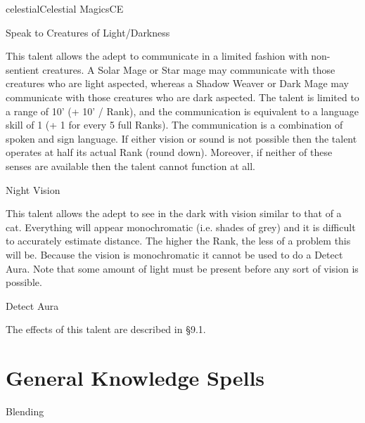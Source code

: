 \begin{College}[1.3]{celestial}{Celestial Magics}{CE}
\begin{talent}[T-1]{Speak to Creatures of Light/Darkness}
\begin{effects}
This talent allows the adept to communicate in a limited fashion with
non-sentient creatures.  A Solar Mage or Star mage may communicate
with those creatures who are light aspected, whereas a Shadow Weaver
or Dark Mage may communicate with those creatures who are dark
aspected.  The talent is limited to a range of 10’ (+ 10’ / Rank), and
the communication is equivalent to a language skill of 1 (+ 1 for
every 5 full Ranks).  The communication is a combination of spoken and
sign language.  If either vision or sound is not possible then the
talent operates at half its actual Rank (round down).  Moreover, if
neither of these senses are available then the talent cannot function
at all.
\end{effects}
\end{talent}

\begin{talent}[T-2]{Night Vision}

\begin{effects}
This talent allows the adept to see in the dark with vision similar to
that of a cat. Everything will appear monochromatic (i.e.  shades of
grey) and it is difficult to accurately estimate distance.  The higher
the Rank, the less of a problem this will be. Because the vision is
monochromatic it cannot be used to do a Detect Aura.  Note that some
amount of light must be present before any sort of vision is possible.
\end{effects}
\end{talent}

\begin{talent}[T-3]{Detect Aura }

\begin{effects}
 The effects of this talent are described in §9.1.
\end{effects}
\end{talent}


\section{General Knowledge Spells}

\begin{spell}[G-1]{Blending}


\end{spell}
\end{College}
